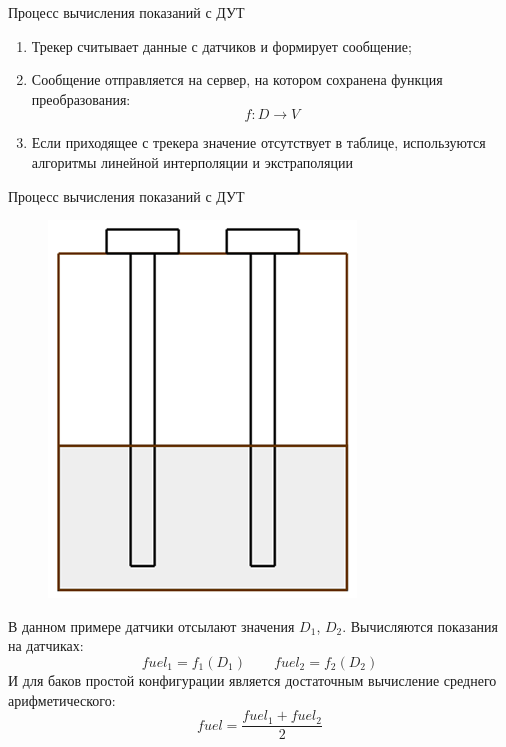 \documentclass[usenames,dvipsnames,11pt]{beamer}
\begin{document}
\begin{frame}{Процесс вычисления показаний с ДУТ}
	\begin{enumerate}
		\item Трекер считывает данные с датчиков и формирует сообщение;
		\item Сообщение отправляется на сервер, на котором сохранена функция преобразования:
		$$f:D \rightarrow V$$
		\item Если приходящее с трекера значение отсутствует в таблице, используются алгоритмы линейной интерполяции и экстраполяции
	\end{enumerate}
\end{frame}

\begin{frame}{Процесс вычисления показаний с ДУТ}
	\begin{minipage}[h]{0.39\linewidth}
			\begin{figure}
			\centering
			\includegraphics[width=0.9\linewidth]{graphics/screenshot003}
			\end{figure}
		\end{minipage}
		\hfill
		\begin{minipage}[h]{0.59\linewidth}
			В данном примере датчики отсылают значения $D_1$, $D_2$. Вычисляются показания на датчиках:
			$$fuel_1 = f_1(D_1) \qquad fuel_2 = f_2(D_2)$$
			И для баков простой конфигурации является достаточным вычисление среднего арифметического:
			$$fuel = \frac{fuel_1 + fuel_2}{2}$$ 	
		\end{minipage}
\end{frame}
\end{document}
